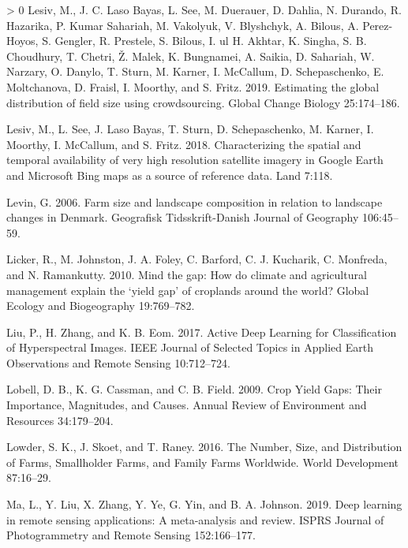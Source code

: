 \documentclass[11pt,a4paper]{article}
\newlength{\cslhangindent}
\newenvironment{CSLReferences}[3] %
 {%
  \setlength{\parindent}{0pt}
  \ifodd #1 \everypar{\setlength{\hangindent}{\cslhangindent}}\ignorespaces\fi
  \ifnum #2 > 0
  \setlength{\parskip}{#2\baselineskip}
  \fi
 }%
 {}
\begin{document}
\begin{CSLReferences}{1}{0}
\leavevmode\hypertarget{ref-lesivEstimatingGlobalDistribution2019}{}%
Lesiv, M., J. C. Laso Bayas, L. See, M. Duerauer, D. Dahlia, N. Durando,
R. Hazarika, P. Kumar Sahariah, M. Vakolyuk, V. Blyshchyk, A. Bilous, A.
Perez-Hoyos, S. Gengler, R. Prestele, S. Bilous, I. ul H. Akhtar, K.
Singha, S. B. Choudhury, T. Chetri, Ž. Malek, K. Bungnamei, A. Saikia,
D. Sahariah, W. Narzary, O. Danylo, T. Sturn, M. Karner, I. McCallum, D.
Schepaschenko, E. Moltchanova, D. Fraisl, I. Moorthy, and S. Fritz.
2019. Estimating the global distribution of field size using
crowdsourcing. Global Change Biology 25:174--186.

\leavevmode\hypertarget{ref-LesivCharacterizingspatialtemporal2018}{}%
Lesiv, M., L. See, J. Laso Bayas, T. Sturn, D. Schepaschenko, M. Karner,
I. Moorthy, I. McCallum, and S. Fritz. 2018. Characterizing the spatial
and temporal availability of very high resolution satellite imagery in
{Google Earth} and {Microsoft Bing} maps as a source of reference data.
Land 7:118.

\leavevmode\hypertarget{ref-levinFarmSizeLandscape2006}{}%
Levin, G. 2006. Farm size and landscape composition in relation to
landscape changes in {Denmark}. Geografisk Tidsskrift-Danish Journal of
Geography 106:45--59.

\leavevmode\hypertarget{ref-LickerMindgaphow2010}{}%
Licker, R., M. Johnston, J. A. Foley, C. Barford, C. J. Kucharik, C.
Monfreda, and N. Ramankutty. 2010. Mind the gap: How do climate and
agricultural management explain the {`yield gap'} of croplands around
the world? Global Ecology and Biogeography 19:769--782.

\leavevmode\hypertarget{ref-liuActiveDeepLearning2017}{}%
Liu, P., H. Zhang, and K. B. Eom. 2017. Active {Deep Learning} for
{Classification} of {Hyperspectral Images}. IEEE Journal of Selected
Topics in Applied Earth Observations and Remote Sensing 10:712--724.

\leavevmode\hypertarget{ref-lobellCropYieldGaps2009}{}%
Lobell, D. B., K. G. Cassman, and C. B. Field. 2009. Crop {Yield Gaps}:
{Their Importance}, {Magnitudes}, and {Causes}. Annual Review of
Environment and Resources 34:179--204.

\leavevmode\hypertarget{ref-LowderNumberSizeDistribution2016}{}%
Lowder, S. K., J. Skoet, and T. Raney. 2016. The {Number}, {Size}, and
{Distribution} of {Farms}, {Smallholder Farms}, and {Family Farms
Worldwide}. World Development 87:16--29.

\leavevmode\hypertarget{ref-maDeepLearningRemote2019}{}%
Ma, L., Y. Liu, X. Zhang, Y. Ye, G. Yin, and B. A. Johnson. 2019. Deep
learning in remote sensing applications: {A} meta-analysis and review.
ISPRS Journal of Photogrammetry and Remote Sensing 152:166--177.


\end{CSLReferences}
\end{document}
